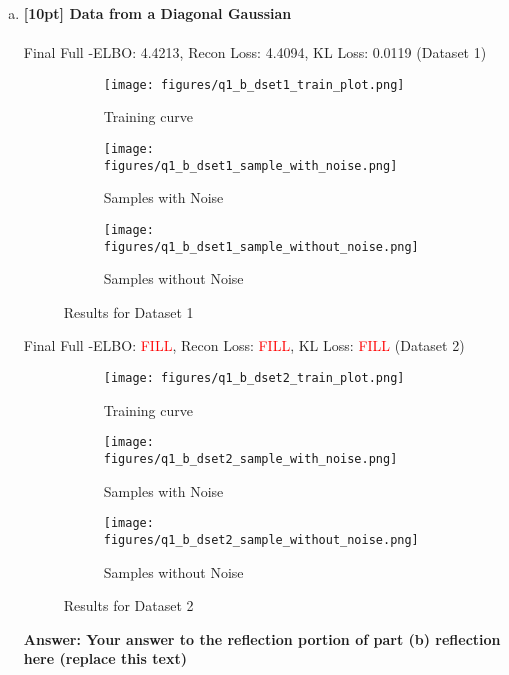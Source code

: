 \documentclass{article}
\begin{document}
\begin{enumerate}[(a)]
\item {\bf [10pt] Data from a Diagonal Gaussian} \\\\
Final Full -ELBO: 4.4213, Recon Loss: 4.4094, KL Loss: 0.0119 (Dataset 1)
\begin{figure}[H]
    \centering
    \begin{subfigure}{0.32\textwidth}
        \centering
        \texttt{[image: figures/q1\_b\_dset1\_train\_plot.png]}
        \caption{Training curve}
    \end{subfigure}
    \begin{subfigure}{0.32\textwidth}
        \centering
        \texttt{[image: figures/q1\_b\_dset1\_sample\_with\_noise.png]}
        \caption{Samples with Noise}
    \end{subfigure}
    \begin{subfigure}{0.32\textwidth}
        \centering
        \texttt{[image: figures/q1\_b\_dset1\_sample\_without\_noise.png]}
        \caption{Samples without Noise}
    \end{subfigure}
    \caption{Results for Dataset 1}
\end{figure}
Final Full -ELBO: \textcolor{red}{FILL}, Recon Loss: \textcolor{red}{FILL}, KL Loss: \textcolor{red}{FILL} (Dataset 2)
\begin{figure}[H]
    \centering
    \begin{subfigure}{0.32\textwidth}
        \centering
        \texttt{[image: figures/q1\_b\_dset2\_train\_plot.png]}
        \caption{Training curve}
    \end{subfigure}
    \begin{subfigure}{0.32\textwidth}
        \centering
        \texttt{[image: figures/q1\_b\_dset2\_sample\_with\_noise.png]}
        \caption{Samples with Noise}
    \end{subfigure}
    \begin{subfigure}{0.32\textwidth}
        \centering
        \texttt{[image: figures/q1\_b\_dset2\_sample\_without\_noise.png]}
        \caption{Samples without Noise}
    \end{subfigure}
    \caption{Results for Dataset 2}
\end{figure}
\textbf{Answer: Your answer to the reflection portion of part (b) reflection here (replace this text)}
\end{enumerate}



\newpage
{}
\end{document}
